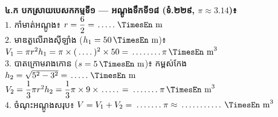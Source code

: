 \documentclass[a4paper,10pt]{article}
\newcommand{\en}[1]{{\TimesEn #1}}
\newcommand{\unit}[1]{\,\text{\en{#1}}}
\newcommand{\blank}[1]{\makebox[#1]{\dotfill}}
\begin{document}
\noindent
\begin{minipage}[t]{10.1cm}\vspace{0pt}
  \begin{tcolorbox}[
    enhanced, sharp corners, colback=white, colframe=black, equal height group=rowE5,
    boxrule=0.85pt, boxsep=3.5pt, top=7.5pt, bottom=7.5pt, left=5.5pt, right=5.5pt
  ]\raggedright
    \textbf{៤.ក បកស្រាយបេសកកម្មទី១ — អណ្ដូងទឹកទី១៨ (ទំ.២២៩, $\pi\approx 3.14$)៖}\\[5.5pt]
    $1.$ កាំមាត់អណ្ដូង៖ $r = \dfrac{6}{2} = \blank{0.8cm}\unit{m}$\\[4.5pt]
    $2.$ មាឌតួលើរាងស៊ីឡាំង ($h_1 = 50\unit{m}$)៖\\[3.5pt]
    \hspace*{0.15cm}$V_1 = \pi r^2 h_1 = \pi\times (\blank{0.7cm})^2\times 50 = \blank{1.3cm}\pi\unit{m}^3$\\[4.5pt]
    $3.$ បាតក្រោមរាងកោន ($s = 5\unit{m}$)៖ កម្ពស់កែង $h_2 = \sqrt{5^2 - 3^2} = \blank{0.8cm}\unit{m}$\\[3.5pt]
    \hspace*{0.15cm}$V_2 = \dfrac{1}{3}\pi r^2 h_2 = \dfrac{1}{3}\pi\times 9\times \blank{0.8cm} = \blank{1.2cm}\pi\unit{m}^3$\\[4.5pt]
    $4.$ ចំណុះអណ្ដូងសរុប៖ $V = V_1 + V_2 = \blank{1.2cm}\pi \approx \blank{1.8cm}\unit{m}^3$
  \end{tcolorbox}
\end{minipage}%
\hfill
\end{document}
